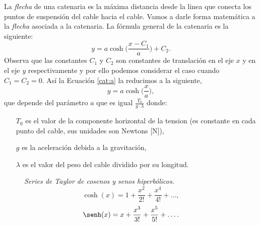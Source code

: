 La \emph{flecha} de una catenaria es la máxima distancia desde la
linea que conecta los puntos de suspensión del cable hacia el
cable. Vamos a darle forma matemática a la  \emph{flecha} asociada a la
catenaria. La fórmula general de la catenaria es la siguiente:
\begin{equation}\label{cat:a}
  y = a\cosh\Big(\frac{x-C_1}{a}\Big)+C_2.
\end{equation}
Observa que las constantes $C_1$ y $C_2$ son constantes de translación en el eje $x$ y
en el eje $y$ respectivamente y por ello podemos considerar el caso cuando $C_1=C_2=0$. Así la Ecuación \ref{cat:a} la
reducimos a la siguiente,
\begin{equation}\label{cat:b}
  y = a\cosh\Big(\frac{x}{a}\Big),
\end{equation}
que depende del parámetro $a$ que es igual $\frac{T_0}{g\cdot\lambda}$ donde:
\begin{itemize}[noitemsep,nolistsep]
\item[$T_0$] es el valor de la componente horizontal de la tension (es
  constante en cada punto del cable, sus unidades son Newtons [\si{N}]),
\item[$g$] es la aceleración debida a la gravitación,
\item[$\lambda$] es el valor del peso del cable dividido por su longitud.
\end{itemize}


\begin{figure}
  \vspace{-2.1cm}
  \begin{mybox}
    \centering
    \emph{\textcolor{bluesol}{Series de Taylor de cosenos y senos
        hiperbólicos.}}
    \begin{equation}
      \label{eq:10}
      \cosh(x)=1+\frac{x^2}{2!}+\frac{x^4}{4!}+\ldots,
    \end{equation}
    \begin{equation}
      \label{eq:11}
      \senh(x)=x+\frac{x^3}{3!}+\frac{x^5}{5!}+\ldots.
    \end{equation}
  \end{mybox}
  \vspace{-.8cm}
\end{figure}






